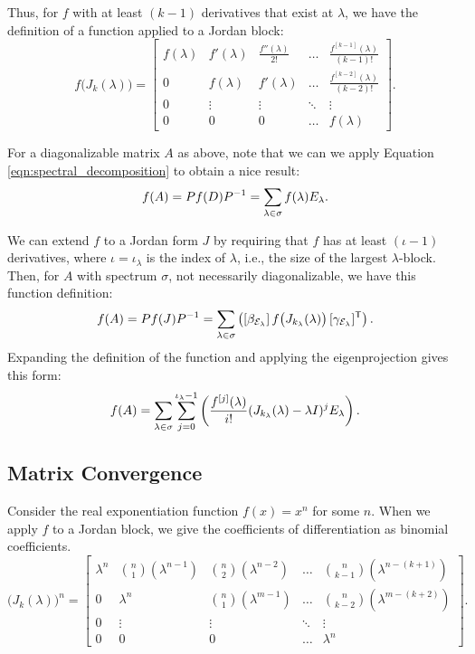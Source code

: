\documentclass[../exploring-pagerank.tex]{subfiles}
\begin{document}
    Thus, for $f$ with at least $(k - 1)$ derivatives that exist at $\lambda$, we have the definition of a function applied to a Jordan block:
	\begin{equation}\label{eq:f_jordan_block}
		f\big( J_k(\lambda) \big) =
		\begin{bmatrix}
			f(\lambda) & f'(\lambda) & \frac{f''(\lambda)}{2!} & \ldots & \frac{f^{[k - 1]}(\lambda)}{(k-1)!} \\
			0 & f(\lambda) & f'(\lambda) & \ldots & \frac{f^{[k - 2]}(\lambda)}{(k-2)!} \\
			0 & \vdots & \vdots & \ddots & \vdots \\
			0 & 0 & 0 & \ldots & f(\lambda)
		\end{bmatrix}.
	\end{equation}
	
	For a diagonalizable matrix $A$ as above, note that we can we apply Equation \eqref{eqn:spectral_decomposition} to obtain a nice result:
	\begin{align*}
	    f(A) = Pf(D)P^{-1} = \sum_{\lambda \in \sigma}{f(\lambda) E_\lambda}.
	\end{align*}
	
	We can extend $f$ to a Jordan form $J$ by requiring that $f$ has at least $(\iota - 1)$ derivatives, where $\iota = \iota_\lambda$ is the index of $\lambda$, i.e., the size of the largest $\lambda$-block. Then, for $A$ with spectrum $\sigma$, not necessarily diagonalizable, we have this function definition:
	\begin{equation*}
	    f(A) = P f(J) P^{-1} = \sum_{\lambda \in \sigma}\left(  [\beta_{\mathcal{E}_\lambda}]\, f\big( J_{k_\lambda}(\lambda) \big)\, [\gamma_{\mathcal{E}_\lambda}]^{\mathsf{T}}  \right).
	\end{equation*}
    Expanding the definition of the function and applying the eigenprojection gives this form:
    \begin{equation}
        f(A) = \sum_{\lambda \in \sigma}\sum_{j=0}^{\iota_{\lambda} - 1}\left(  \frac{f^{[j]}(\lambda)}{i!} (J_{k_\lambda}(\lambda) - \lambda I)^j E_{\lambda}  \right).
    \end{equation}
    
    \subsection{Matrix Convergence} 
    Consider the real exponentiation function $f(x) = x^n$ for some $n$. When we apply $f$ to a Jordan block, we give the coefficients of differentiation as binomial coefficients.
	\begin{equation}\label{eq:power_jordan_block}
		\big( J_k(\lambda) \big)^n =
		\begin{bmatrix}
			\lambda^n & \binom{n}{1}(\lambda^{n-1}) & \binom{n}{2}(\lambda^{n-2}) & \ldots & \binom{n}{k-1}(\lambda^{n-(k+1)}) \\
			0 & \lambda^n & \binom{n}{1}(\lambda^{m-1}) & \ldots & \binom{n}{k-2}(\lambda^{m-(k+2)}) \\
			0 & \vdots & \vdots & \ddots & \vdots \\
			0 & 0 & 0 & \ldots & \lambda^n
		\end{bmatrix}.
	\end{equation}
\end{document}
